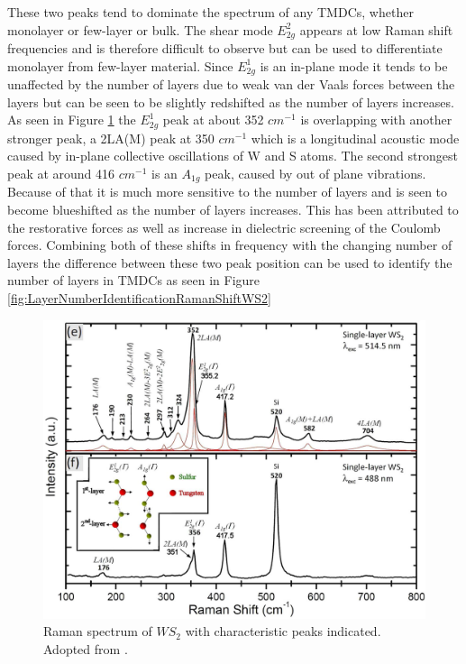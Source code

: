 These two peaks tend to dominate the spectrum of any TMDCs, whether monolayer or few-layer or bulk. The shear mode $E^2_{2g}$ appears at low Raman shift frequencies and is therefore difficult to observe but can be used to differentiate monolayer from few-layer material. Since $E^1_{2g}$ is an in-plane mode it tends to be unaffected by the number of layers due to weak van der Vaals forces between the layers but can be seen to be slightly redshifted as the number of layers increases. As seen in Figure \ref{fig:TypicalRamanSpectrumWS2} the $E^1_{2g}$ peak at about 352 $cm^{-1}$ is overlapping with another stronger peak, a 2LA(M) peak at 350 $cm^{-1}$ which is a longitudinal acoustic mode caused by in-plane collective oscillations of W and S atoms. The second strongest peak at around 416 $cm^{-1}$ is an $A_{1g}$ peak, caused by out of plane vibrations. Because of that it is much more sensitive to the number of layers and is seen to become blueshifted as the number of layers increases. This has been attributed to the restorative forces as well as increase in dielectric screening of the Coulomb forces. Combining both of these shifts in frequency with the changing number of layers the difference between these two peak position can be used to identify the number of layers in TMDCs as seen in Figure \ref{fig:LayerNumberIdentificationRamanShiftWS2}
	
\begin{figure}[ht]
	\begin{center}
		\includegraphics[scale=0.3]{RamanPeaksIdentification.png}
		\caption{Raman spectrum of $WS_2$ with characteristic peaks indicated. Adopted from \cite{Berkdemir2013}.}
		\label{fig:TypicalRamanSpectrumWS2}
	\end{center}
\end{figure}
	
